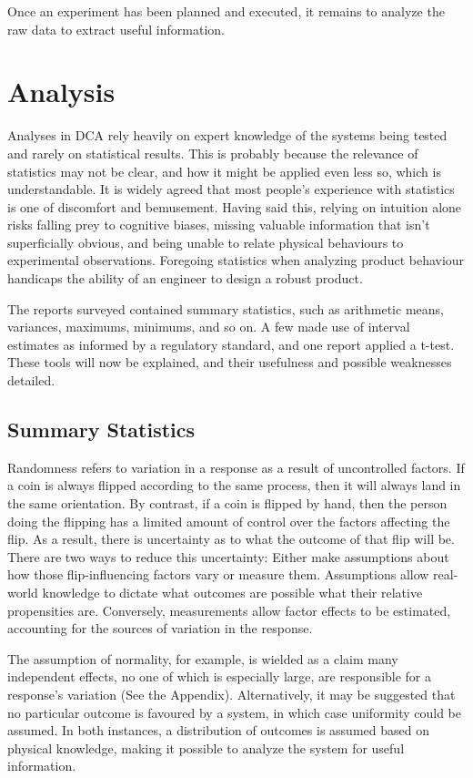 \documentclass[11pt,a4paper,article]{memoir} %
\begin{document}
Once an experiment has been planned and executed, it remains to analyze the raw data to extract useful information.

\vspace{48pt}
\section{Analysis}
Analyses in DCA rely heavily on expert knowledge of the systems being tested and rarely on statistical results. This is probably because the relevance of statistics may not be clear, and how it might be applied even less so, which is understandable. It is widely agreed that most people's experience with statistics is one of discomfort and bemusement. Having said this, relying on intuition alone risks falling prey to cognitive biases, missing valuable information that isn't superficially obvious, and being unable to relate physical behaviours to experimental observations. Foregoing statistics when analyzing product behaviour handicaps the ability of an engineer to design a robust product.
\par
The reports surveyed contained summary statistics, such as arithmetic means, variances, maximums, minimums, and so on. A few made use of interval estimates as informed by a regulatory standard, and one report applied a t-test. These tools will now be explained, and their usefulness and possible weaknesses detailed.
\par
\subsection*{Summary Statistics}
 Randomness refers to variation in a response as a result of uncontrolled factors. If a coin is always flipped according to the same process, then it will always land in the same orientation. By contrast, if a coin is flipped by hand, then the person doing the flipping has a limited amount of control over the factors affecting the flip. As a result, there is uncertainty as to what the outcome of that flip will be. There are two ways to reduce this uncertainty: Either make assumptions about how those flip-influencing factors vary or measure them. Assumptions allow real-world knowledge to dictate what outcomes are possible what their relative propensities are. Conversely, measurements allow factor effects to be estimated, accounting for the sources of variation in the response.
 
  The assumption of normality, for example, is wielded as a claim many independent effects, no one of which is especially large, are responsible for a response's variation (See the Appendix). Alternatively, it may be suggested that no particular outcome is favoured by a system, in which case uniformity could be assumed. In both instances, a distribution of outcomes is assumed based on physical knowledge, making it possible to analyze the system for useful information.
 
\end{document}
